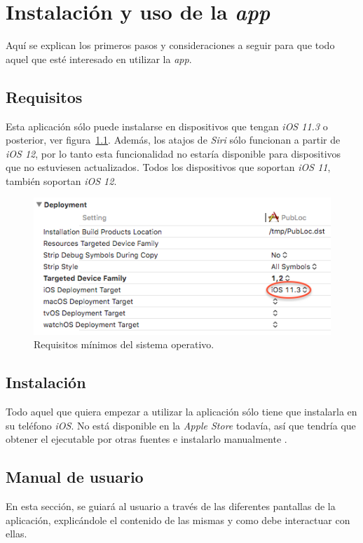 \chapter{Instalación y uso de la \emph{app}}
Aquí se explican los primeros pasos y consideraciones a seguir para que todo aquel que esté interesado en utilizar la \textit{app}.
\section{Requisitos}
Esta aplicación sólo puede instalarse en dispositivos que tengan \textit{iOS 11.3} o posterior, ver figura~\ref{fig:target}. Además, los atajos de \textit{Siri} sólo funcionan a partir de \textit{iOS 12}, por lo tanto esta funcionalidad no estaría disponible para dispositivos que no estuviesen actualizados. Todos los dispositivos que soportan \textit{iOS 11}, también soportan \textit{iOS 12}.

\begin{figure}[tbp]
\centering
\includegraphics[scale=0.6]{figures/target.png}
\caption{Requisitos mínimos del sistema operativo.\label{fig:target}}
\end{figure}

\section{Instalación}
Todo aquel que quiera empezar a utilizar la aplicación sólo tiene que instalarla en su teléfono  \textit{iOS}. No está disponible en la \textit{Apple Store} todavía, así que tendría que obtener el ejecutable por otras fuentes e instalarlo manualmente \cite{noauthor_como_nodate}.

\section{Manual de usuario\label{apen:manual-usuario}}
En esta sección, se guiará al usuario a través de las diferentes pantallas de la aplicación, explicándole el contenido de las mismas y como debe interactuar con ellas.

